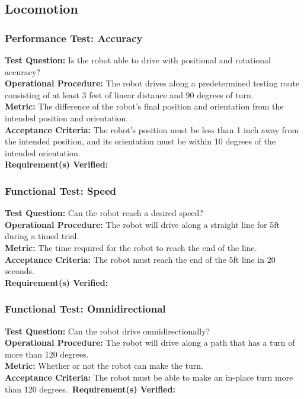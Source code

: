 
\subsection{Locomotion}
\label{sec:verification_locomotion}

\subsubsection{Performance Test: Accuracy}
\label{test:locomotion_pt_accuracy}
\textbf{Test Question:} Is the robot able to drive with positional and rotational accuracy?\\
\textbf{Operational Procedure:} The robot drives along a predetermined testing route consisting of at least 3 feet of linear distance and 90 degrees of turn.\\
\textbf{Metric:} The difference of the robot's final position and orientation from the intended position and orientation. \\
\textbf{Acceptance Criteria:} The robot's position must be less than 1 inch away from the intended position, and its orientation must be within 10 degrees of the intended orientation.\\
\textbf{Requirement(s) Verified:} 

\subsubsection{Functional Test: Speed}
\label{test:locomotion_ft_speed}
\textbf{Test Question:} Can the robot reach a desired speed? \\
\textbf{Operational Procedure:} The robot will drive along a straight line for 5ft during a timed trial.\\
\textbf{Metric:} The time required for the robot to reach the end of the line.\\
\textbf{Acceptance Criteria:} The robot must reach the end of the 5ft line in 20 seconds. \\
\textbf{Requirement(s) Verified:} 

\subsubsection{Functional Test: Omnidirectional}
\label{test:locomotion_ft_omni}
\textbf{Test Question:} Can the robot drive omnidirectionally? \\
\textbf{Operational Procedure:} The robot will drive along a path that has a turn of more than 120 degrees.\\
\textbf{Metric:} Whether or not the robot can make the turn.\\
\textbf{Acceptance Criteria:} The robot must be able to make an in-place turn more than 120 degrees.\
\textbf{Requirement(s) Verified:} 

